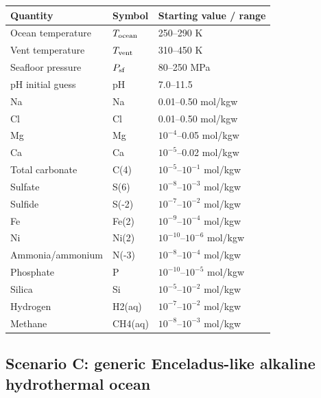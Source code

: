 \documentclass[11pt]{article}
\newcommand{\SIrange}[3]{#1--#2 #3}
\begin{document}
\begin{longtable}{lll}
\toprule
Quantity & Symbol & Starting value / range \\
\midrule
Ocean temperature & $T_{\rm ocean}$ & \SIrange{250}{290}{K} \\
Vent temperature & $T_{\rm vent}$ & \SIrange{310}{450}{K} \\
Seafloor pressure & $P_{\rm sf}$ & \SIrange{80}{250}{MPa} \\
pH initial guess & pH & 7.0--11.5 \\
Na & Na & 0.01--0.50 mol/kgw \\
Cl & Cl & 0.01--0.50 mol/kgw \\
Mg & Mg & $10^{-4}$--0.05 mol/kgw \\
Ca & Ca & $10^{-5}$--0.02 mol/kgw \\
Total carbonate & C(4) & $10^{-5}$--$10^{-1}$ mol/kgw \\
Sulfate & S(6) & $10^{-8}$--$10^{-3}$ mol/kgw \\
Sulfide & S(-2) & $10^{-7}$--$10^{-2}$ mol/kgw \\
Fe & Fe(2) & $10^{-9}$--$10^{-4}$ mol/kgw \\
Ni & Ni(2) & $10^{-10}$--$10^{-6}$ mol/kgw \\
Ammonia/ammonium & N(-3) & $10^{-8}$--$10^{-4}$ mol/kgw \\
Phosphate & P & $10^{-10}$--$10^{-5}$ mol/kgw \\
Silica & Si & $10^{-5}$--$10^{-2}$ mol/kgw \\
Hydrogen & H2(aq) & $10^{-7}$--$10^{-2}$ mol/kgw \\
Methane & CH4(aq) & $10^{-8}$--$10^{-3}$ mol/kgw \\
\bottomrule
\end{longtable}

\subsection{Scenario C: generic Enceladus-like alkaline hydrothermal ocean}
\end{document}
